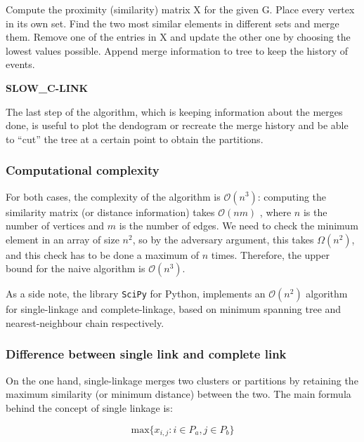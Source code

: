 \documentclass[12pt,a4paper]{article}
\begin{document}
\begin{algorithm}[h]
  \SetAlgoLined

  \nl Compute the proximity (similarity) matrix X for the given G.\;
  \nl Place every vertex in its own set.\;
  \nl Find the two most similar elements in different sets and merge them.\;
  \nl Remove one of the entries in X and update the other one by choosing the lowest
  values possible.\;
  \nl Append merge information to tree to keep the history of events.\;
  \nl {}
  \caption{\bf SLOW\_C-LINK}
  \label{clink}
\end{algorithm}

The last step of the algorithm, which is keeping information about
the merges done, is useful to plot the dendogram or recreate the
merge history and be able to ``cut'' the tree at a certain point to
obtain the partitions.

\subsubsection{Computational complexity}

For both cases, the complexity of the algorithm is
$\mathcal{O}(n^3)$: computing the similarity matrix (or distance
information) takes $\mathcal{O}(nm)$ \cite{newman}, where $n$ is the
number of vertices and $m$ is the number of edges. We need to check
the minimum element in an array of size $n^2$, so by the adversary
argument, this takes $\Omega (n^2)$, and this check has to be
done a maximum of $n$ times. Therefore, the upper bound for the
naive algorithm is $\mathcal{O}(n^3)$.

As a side note, the library \texttt{SciPy} for Python, implements an
$\mathcal{O}(n^2)$ algorithm for single-linkage and
complete-linkage, based on minimum spanning tree and
nearest-neighbour chain respectively.

\subsubsection{Difference between single link and complete link}

On the one hand, single-linkage merges two clusters or partitions by
retaining the maximum similarity (or minimum distance) between the
two. The main formula behind the concept of single linkage is:

$$ \mathrm{max}\{x_{i,j} : i \in P_a, j \in P_b\} $$
\end{document}
